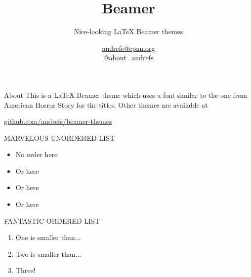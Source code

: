 \documentclass[serif,14pt,color=usenames,dvipsnames]{beamer}
\title{Beamer}
\subtitle{Nice-looking LaTeX Beamer themes}
\author{\href{mailto:andrefs@cpan.org}{andrefs@cpan.org}\\\href{http://twitter.com/about\_andrefs}{@about\_andrefs}}
\institute{Institute, Location}
\begin{document}
\begin{frame}
\maketitle
\end{frame}

\begin{frame}{About}
This is a LaTeX Beamer theme which uses a font similar to the one from
American Horror Story for the titles. Other themes are available at
\begin{center}
\url{github.com/andrefs/beamer-themes}
\end{center}
\end{frame}

\begin{frame}{MARVELOUS UNORDERED LIST}
\begin{itemize}
\item No order here
\item Or here
\item Or here
\item Or here
\end{itemize}
\end{frame}

\begin{frame}{FANTASTIC ORDERED LIST}
\begin{enumerate}
	\item One is smaller than...
	\item Two is smaller than...
	\item Three!
\end{enumerate}
\end{frame}
\end{document}
